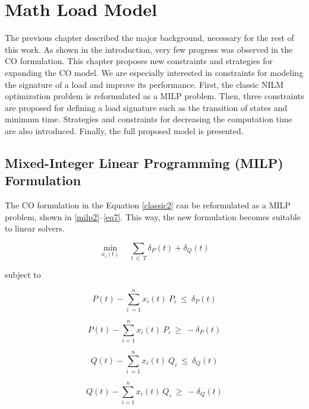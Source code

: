 
\chapter{Math Load Model}

The previous chapter described the major background, necessary for the rest of this work. As shown in the introduction, very few progress was observed in the CO formulation. This chapter proposes new constraints and strategies for expanding the CO model. We are especially interested in constraints for modeling the signature of a load and improve its performance. First, the classic NILM optimization problem is reformulated as a MILP problem. Then, three constraints are proposed for defining a load signature such as the transition of states and minimum time. Strategies and constraints for decreasing the computation time are also introduced. Finally, the full proposed model is presented. 

\section{Mixed-Integer Linear Programming (MILP) Formulation}

The CO formulation in the Equation \eqref{classic2} can be reformulated as a MILP problem, shown in \eqref{milp2}--\eqref{eq7}. This way, the new formulation becomes suitable to linear solvers.

\begin{equation} \label{milp2}
    \min_{x_i(t)} \quad \sum_{t\ \in\ T} \delta_P(t) + \delta_Q(t)
\end{equation}

subject to 

\begin{equation} \label{eq65}
    P(t) - \sum_{i\ = 1}^{n} x_i(t)\ P_i \ \leq \ \delta_P(t) 
\end{equation}

\begin{equation} 
  P(t) - \sum_{i = 1}^{n} x_i(t)\ P_i \ \geq \ -\delta_P(t)
\end{equation}

\begin{equation} 
   Q(t) - \sum_{i\ = 1}^{n} x_i(t)\ Q_i \ \leq \ \delta_Q(t)
\end{equation}

\begin{equation} \label{eq7}
  Q(t) - \sum_{i = 1}^{n} x_i(t)\ Q_i \ \geq \ -\delta_Q(t)
\end{equation}

